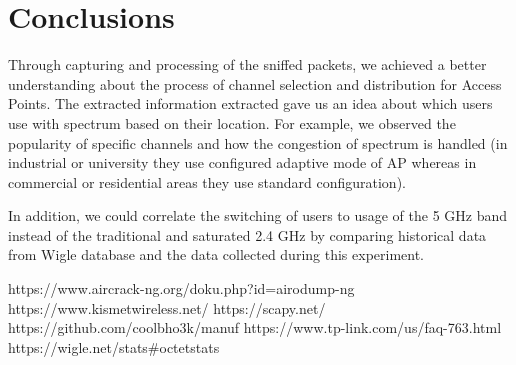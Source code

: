 \documentclass[conference]{IEEEtran}
\begin{document}
\section{Conclusions}
Through capturing and processing of the sniffed packets, we achieved a better understanding about the process of channel selection and distribution for Access Points. The extracted information extracted gave us an idea about which users use with spectrum based on their location. For example, we observed the popularity of specific channels and how the congestion of spectrum is handled (in industrial or university they use configured adaptive mode of AP whereas in commercial or residential areas they use standard configuration). 

In addition, we could correlate the switching of users to usage of the 5 GHz band instead of the traditional and saturated 2.4 GHz by comparing historical data from Wigle database and the data collected during this experiment.       

\begin{thebibliography}{99}
 https://www.aircrack-ng.org/doku.php?id=airodump-ng
 https://www.kismetwireless.net/
https://scapy.net/
https://github.com/coolbho3k/manuf
 https://www.tp-link.com/us/faq-763.html
 https://wigle.net/stats#octetstats
\end{thebibliography}
\end{document}
